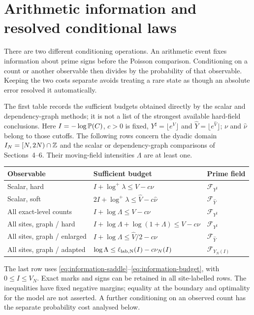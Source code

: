 \section{Arithmetic information and resolved conditional laws}
\label{sec:conditional-laws}
There are two different conditioning operations. An arithmetic event fixes
information about prime signs before the Poisson comparison. Conditioning
on a count or another observable then divides by the probability of that
observable. Keeping the two costs separate avoids treating a rare state as
though an absolute error resolved it automatically.


The first table records the sufficient budgets obtained directly by the
scalar and dependency-graph methods; it is not a list of the strongest
available hard-field conclusions. Here $I=-\log\mathbb P(C)$,
$c>0$ is fixed, $Y^\sharp=\lfloor e^V\rfloor$ and
$\widehat Y=\lfloor e^{\widehat V}\rfloor$; $\nu$ and $\widehat\nu$ belong
to those cutoffs. The following rows concern the dyadic domain
$I_N=[N,2N)\cap\mathbb Z$ and the scalar or dependency-graph comparisons of
Sections~4--6. Their moving-field intensities $\Lambda$ are at least one.
\begin{center}\small
\begin{tabularx}{\textwidth}{@{}L{.25\textwidth}Xl@{}}\toprule
Observable & Sufficient budget & Prime field\\\midrule
Scalar, hard & $I+\log^+\lambda\le V-c\nu$ & $\mathcal F_{Y^\sharp}$\\
Scalar, soft & $2I+\log^+\lambda\le\widehat V-c\widehat\nu$ & $\mathcal F_{\widehat Y}$\\
All exact-level counts & $I+\log\Lambda\le V-c\nu$ & $\mathcal F_{Y^\sharp}$\\
All sites, graph / hard & $I+\log\Lambda+\log(1+\Lambda)\le V-c\nu$ & $\mathcal F_{Y^\sharp}$\\
All sites, graph / enlarged & $I+\log\Lambda\le\widehat V/2-c\widehat\nu$ & $\mathcal F_{\widehat Y}$\\
All sites, graph / adapted & $\log\Lambda\le\ell_{\rm lab,N}(I)-c\nu_N(I)$ & $\mathcal F_{Y_N(I)}$\\\bottomrule
\end{tabularx}
\end{center}
The last row uses \eqref{eq:information-saddle}--\eqref{eq:information-budget}, with $0\le I\le V_N$. Exact marks and signs can be retained in all site-labelled rows. The inequalities
have fixed negative margins; equality at the boundary and optimality for
the model are not asserted. A further conditioning on an observed count
has the separate probability cost analysed below.

